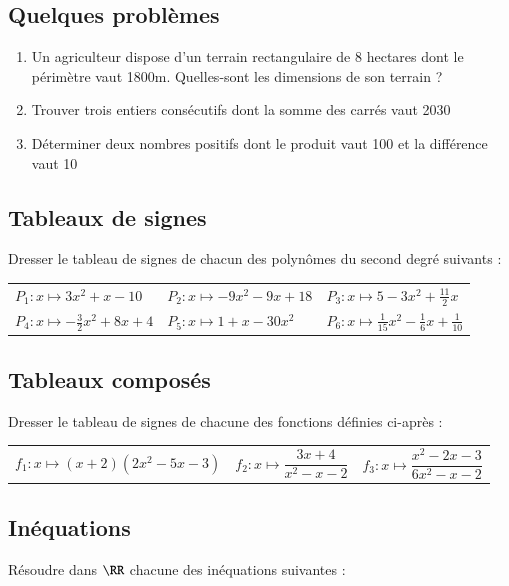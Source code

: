 \documentclass[oneside,12pt]{article}          %
\begin{document}
\subsection{Quelques problèmes}
\begin{enumerate}
    \item Un agriculteur dispose d'un terrain rectangulaire de 8 hectares dont le périmètre vaut 1800m. Quelles-sont les dimensions de son terrain ?
    \item Trouver trois entiers consécutifs dont la somme des carrés vaut 2030
    \item Déterminer deux nombres positifs dont le produit vaut 100 et la différence vaut 10
\end{enumerate}



\subsection{Tableaux de signes}
Dresser le tableau de signes de chacun des polynômes du second degré suivants :

\renewcommand{\arraystretch}{1.5}
\begin{tabular}{p{} p{} p{} }
    $P_1:x\mapsto 3x^2+x-10$ & $P_2:x\mapsto -9x^2-9x+18$ & $P_3:x\mapsto 5-3x^2+\frac{11}{2}x$ \\
    $P_4:x\mapsto -\frac{3}{2}x^2+8x+4$ & $P_5:x\mapsto 1+x-30x^2$ & $P_6:x\mapsto \frac{1}{15}x^2-\frac{1}{6}x +\frac{1}{10}$
\end{tabular}



\subsection{Tableaux composés}
Dresser le tableau de signes de chacune des fonctions définies ci-après :

\renewcommand{\arraystretch}{2}
\begin{tabular}{p{} p{} p{} }
    $f_1:x\mapsto (x+2)(2x^2-5x-3)$ & $f_2:x\mapsto \dfrac{3x+4}{x^2-x-2}$ & $f_3:x\mapsto \dfrac{x^2-2x-3}{6x^2-x-2}$
\end{tabular}



\subsection{Inéquations}
Résoudre dans $\RR$ chacune des inéquations suivantes :
\end{document}
